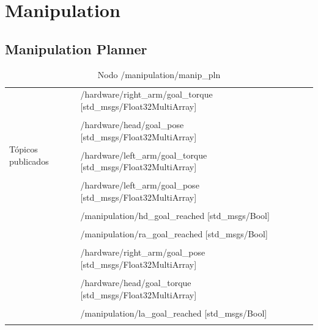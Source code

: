\documentclass[a4paper,usenames,dvipsnames,svgnames,table]{book}
\begin{document}
\section{Manipulation}

\subsection{Manipulation Planner}

\begin{table}[H]
\begin{center}
\begin{tabular}{|l|p{6cm}|p{5cm}|}%
\hline

\multirow{9}{*}{Tópicos publicados}
& /hardware/right\_arm/goal\_torque [std\_msgs/Float32MultiArray] &  \\
& & \\
& /hardware/head/goal\_pose [std\_msgs/Float32MultiArray] &  \\
& & \\
& /hardware/left\_arm/goal\_torque [std\_msgs/Float32MultiArray] &  \\
& & \\
& /hardware/left\_arm/goal\_pose [std\_msgs/Float32MultiArray] &  \\
& & \\
& /manipulation/hd\_goal\_reached [std\_msgs/Bool] &  \\
& & \\
& /manipulation/ra\_goal\_reached [std\_msgs/Bool] &  \\
& & \\
& /hardware/right\_arm/goal\_pose [std\_msgs/Float32MultiArray] &  \\
& & \\
& /hardware/head/goal\_torque [std\_msgs/Float32MultiArray]  &  \\
& & \\
& /manipulation/la\_goal\_reached [std\_msgs/Bool] &  \\
& & \\
\cline{1-3}

\end{tabular}
\caption{Nodo  /manipulation/manip\_pln }
\label{manip pln node t1}
\end{center}
\end{table}
\end{document}
